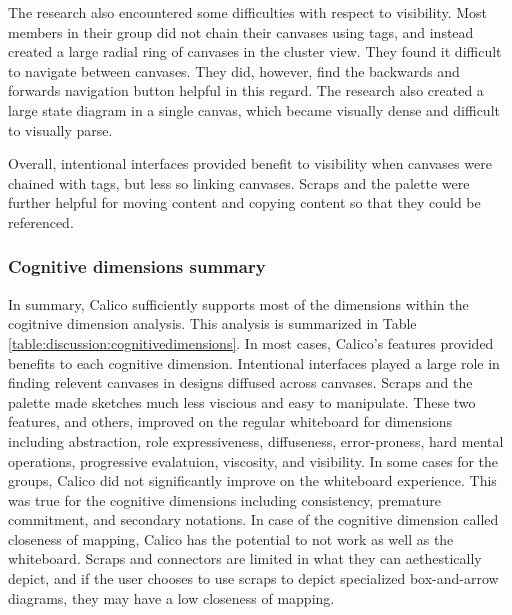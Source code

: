 The research also encountered some difficulties with respect to visibility. Most members in their group did not chain their canvases using tags, and instead created a large radial ring of canvases in the cluster view. They found it difficult to navigate between canvases. They did, however, find the backwards and forwards navigation button helpful in this regard. The research also created a large state diagram in a single canvas, which became visually dense and difficult to visually parse. 

Overall, intentional interfaces provided benefit to visibility when canvases were chained with tags, but less so linking canvases. Scraps and the palette were further helpful for moving content and copying content so that they could be referenced.

\subsubsection{Cognitive dimensions summary}

In summary, Calico sufficiently supports most of the dimensions within the cogitnive dimension analysis. This analysis is summarized in Table \ref{table:discussion:cognitivedimensions}. In most cases, Calico's features provided benefits to each cognitive dimension. Intentional interfaces played a large role in finding relevent canvases in designs diffused across canvases. Scraps and the palette made sketches much less viscious and easy to manipulate. These two features, and others, improved on the regular whiteboard for dimensions including abstraction, role expressiveness, diffuseness, error-proness, hard mental operations, progressive evalatuion, viscosity, and visibility. In some cases for the groups, Calico did not significantly improve on the whiteboard experience. This was true for the cognitive dimensions including consistency, premature commitment, and secondary notations. In case of the cognitive dimension called closeness of mapping, Calico has the potential to not work as well as the whiteboard. Scraps and connectors are limited in what they can aethestically depict, and if the user chooses to use scraps to depict specialized box-and-arrow diagrams, they may have a low closeness of mapping.




